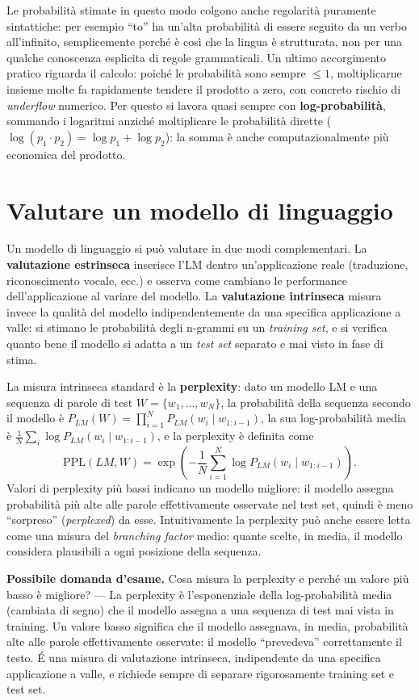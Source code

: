 \documentclass[11pt,a4paper]{report}
\newcommand{\domandaesame}[1]{\begin{esame}\textbf{Possibile domanda d'esame.} #1\end{esame}}
\begin{document}
Le probabilità stimate in questo modo colgono anche regolarità puramente sintattiche: per esempio ``to'' ha un'alta probabilità di essere seguito da un verbo all'infinito, semplicemente perché è così che la lingua è strutturata, non per una qualche conoscenza esplicita di regole grammaticali. Un ultimo accorgimento pratico riguarda il calcolo: poiché le probabilità sono sempre $\le 1$, moltiplicarne insieme molte fa rapidamente tendere il prodotto a zero, con concreto rischio di \emph{underflow} numerico. Per questo si lavora quasi sempre con \textbf{log-probabilità}, sommando i logaritmi anziché moltiplicare le probabilità dirette ($\log(p_1 \cdot p_2) = \log p_1 + \log p_2$): la somma è anche computazionalmente più economica del prodotto.

\section{Valutare un modello di linguaggio}

Un modello di linguaggio si può valutare in due modi complementari. La \textbf{valutazione estrinseca} inserisce l'LM dentro un'applicazione reale (traduzione, riconoscimento vocale, ecc.) e osserva come cambiano le performance dell'applicazione al variare del modello. La \textbf{valutazione intrinseca} misura invece la qualità del modello indipendentemente da una specifica applicazione a valle: si stimano le probabilità degli n-grammi su un \emph{training set}, e si verifica quanto bene il modello si adatta a un \emph{test set} separato e mai visto in fase di stima.

La misura intrinseca standard è la \textbf{perplexity}: dato un modello LM e una sequenza di parole di test $W = \{w_1,\ldots,w_N\}$, la probabilità della sequenza secondo il modello è $P_{LM}(W) = \prod_{i=1}^N P_{LM}(w_i \mid w_{1:i-1})$, la sua log-probabilità media è $\frac{1}{N}\sum_i \log P_{LM}(w_i \mid w_{1:i-1})$, e la perplexity è definita come
\[
\mathrm{PPL}(LM, W) = \exp\left(-\frac{1}{N}\sum_{i=1}^N \log P_{LM}(w_i \mid w_{1:i-1})\right).
\]
Valori di perplexity più bassi indicano un modello migliore: il modello assegna probabilità più alte alle parole effettivamente osservate nel test set, quindi è meno ``sorpreso'' (\emph{perplexed}) da esse. Intuitivamente la perplexity può anche essere letta come una misura del \emph{branching factor} medio: quante scelte, in media, il modello considera plausibili a ogni posizione della sequenza.

\domandaesame{Cosa misura la perplexity e perché un valore più basso è migliore? --- La perplexity è l'esponenziale della log-probabilità media (cambiata di segno) che il modello assegna a una sequenza di test mai vista in training. Un valore basso significa che il modello assegnava, in media, probabilità alte alle parole effettivamente osservate: il modello ``prevedeva'' correttamente il testo. \'E una misura di valutazione intrinseca, indipendente da una specifica applicazione a valle, e richiede sempre di separare rigorosamente training set e test set.}
\end{document}
